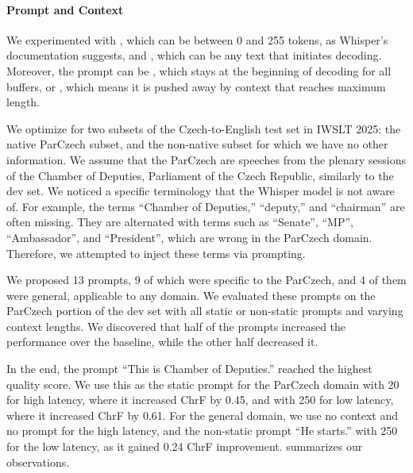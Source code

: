 \documentclass[11pt]{article}
\begin{document}
\paragraph{Prompt and Context}
We experimented with \MaxContextLen{}, which can be between 0 and 255 tokens, as Whisper's documentation suggests, and \Prompt{}, which can be any text that initiates decoding. Moreover, the prompt can be \StaticPrompt{}, which stays at the beginning of decoding for all buffers, or \NonStaticPrompt{}, which means it is pushed away by context that reaches maximum length. 

We optimize for two subsets of the Czech-to-English test set in IWSLT 2025: the native ParCzech subset, and the non-native subset for which we have no other information. We assume that the ParCzech are speeches from the plenary sessions of the Chamber of Deputies, Parliament of the Czech Republic, similarly to the dev set. We noticed a specific terminology that the Whisper model is not aware of. For example, the terms ``Chamber of Deputies,'' ``deputy,'' and ``chairman'' are often missing. They are alternated with terms such as ``Senate'', ``MP'', ``Ambassador'', and ``President'', which are wrong in the ParCzech domain. Therefore, we attempted to inject these terms via prompting. 

We proposed 13 prompts, 9 of which were specific to the ParCzech, and 4 of them were general, applicable to any domain. We evaluated these prompts on the ParCzech portion of the dev set with all static or non-static prompts and varying context lengths. We discovered that half of the prompts increased the performance over the baseline, while the other half decreased it. 

In the end, the prompt ``This is Chamber of Deputies.'' reached the highest quality score. We use this as the static prompt for the ParCzech domain with \MaxContextLen{} 20 for high latency, where it increased ChrF by 0.45, and  with \MaxContextLen{} 250 for low latency, where it increased ChrF by 0.61. For the general domain, we use no context and no prompt for the high latency, and the non-static prompt ``He starts.'' with \MaxContextLen{} 250 for the low latency, as it gained 0.24 ChrF improvement.  summarizes our observations.
\end{document}
